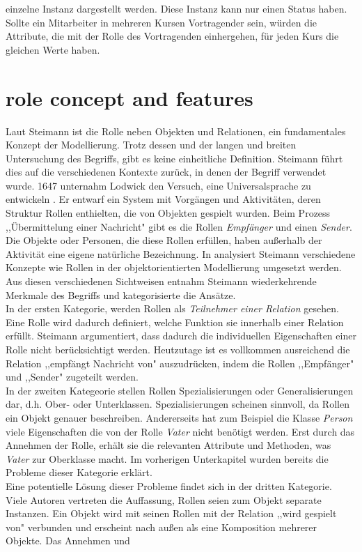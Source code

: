 \documentclass[conference]{IEEEtran}
\begin{document}
einzelne Instanz dargestellt werden. Diese Instanz kann nur einen Status haben. Sollte ein Mitarbeiter in mehreren Kursen Vortragender sein, würden die Attribute, die mit der Rolle des Vortragenden einhergehen, für jeden Kurs die gleichen Werte haben.  



\section{role concept and features}Laut Steimann ist die Rolle neben Objekten und Relationen, ein fundamentales Konzept der Modellierung. Trotz dessen und der langen und breiten Untersuchung des Begriffs, gibt es keine einheitliche Definition. Steimann führt dies auf die verschiedenen Kontexte zurück, in denen der Begriff verwendet wurde. 1647 unternahm Lodwick den Versuch, eine Universalsprache zu entwickeln \cite{hunter2012lodwick}. Er entwarf ein System mit Vorgängen und Aktivitäten, deren Struktur Rollen enthielten, die von Objekten gespielt wurden. Beim Prozess ,,Übermittelung einer Nachricht" gibt es die Rollen \textit{Empfänger} und einen \textit{Sender}. Die Objekte oder Personen, die diese Rollen erfüllen, haben außerhalb der Aktivität eine eigene natürliche Bezeichnung. In \cite{steimann2000representation} analysiert Steimann verschiedene Konzepte wie Rollen in der objektorientierten Modellierung umgesetzt werden. Aus diesen verschiedenen Sichtweisen entnahm Steimann wiederkehrende Merkmale des Begriffs und kategorisierte die Ansätze. \\ In der ersten Kategorie, werden Rollen als \textit{Teilnehmer einer Relation} gesehen. Eine Rolle wird dadurch definiert, welche Funktion sie innerhalb einer Relation erfüllt. Steimann argumentiert, dass dadurch die individuellen Eigenschaften einer Rolle nicht berücksichtigt werden.  Heutzutage ist es vollkommen ausreichend die Relation ,,empfängt Nachricht von" auszudrücken, indem die Rollen ,,Empfänger" und ,,Sender" zugeteilt werden. \\ In der zweiten Kategeorie stellen Rollen Spezialisierungen oder Generalisierungen dar, d.h. Ober- oder Unterklassen. Spezialisierungen scheinen sinnvoll, da Rollen ein Objekt genauer beschreiben. Andererseits hat zum Beispiel die Klasse \textit{Person} viele Eigenschaften die von der Rolle \textit{Vater} nicht benötigt werden. Erst durch das Annehmen der Rolle, erhält sie die relevanten Attribute und Methoden, was \textit{Vater} zur Oberklasse macht. Im vorherigen Unterkapitel wurden bereits die Probleme dieser Kategorie erklärt.\\ Eine potentielle Lösung dieser Probleme findet sich in der dritten Kategorie. Viele Autoren vertreten die Auffassung, Rollen seien  zum Objekt separate Instanzen. Ein Objekt wird mit seinen Rollen mit der Relation ,,wird gespielt von" verbunden und erscheint nach außen als eine Komposition mehrerer Objekte. Das Annehmen und 
\end{document}
